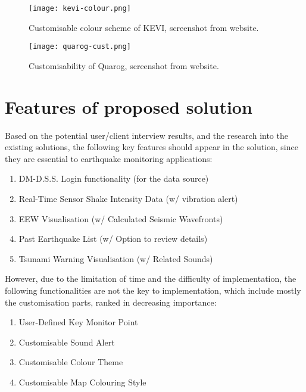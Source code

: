 \begin{figure}[!ht]
    \centering

    \texttt{[image: kevi-colour.png]}
    \caption[Customisable colour scheme of KEVI]{Customisable colour scheme of KEVI, screenshot from website.}
    \label{fig:kevi-colour-cust}
\end{figure}

\begin{figure}[!ht]
    \centering

    \texttt{[image: quarog-cust.png]}
    \caption[Customisability of Quarog]{Customisability of Quarog, screenshot from website.}
    \label{fig:quarog-cust}
\end{figure}



\section{Features of proposed solution}

Based on the potential user/client interview results, and the research into the existing solutions, the following key features should appear in the solution, since they are essential to earthquake monitoring applications:
\begin{enumerate}
    \item DM-D.S.S. Login functionality (for the data source)
    \item Real-Time Sensor Shake Intensity Data (w/ vibration alert)
    \item EEW Visualisation (w/ Calculated Seismic Wavefronts)
    \item Past Earthquake List (w/ Option to review details)
    \item Tsunami Warning Visualisation (w/ Related Sounds)
\end{enumerate}

However, due to the limitation of time and the difficulty of implementation, the following functionalities are not the key to implementation, which include mostly the customisation parts, ranked in decreasing importance:
\begin{enumerate}
    \item User-Defined Key Monitor Point
    \item Customisable Sound Alert
    \item Customisable Colour Theme
    \item Customisable Map Colouring Style
\end{enumerate}

